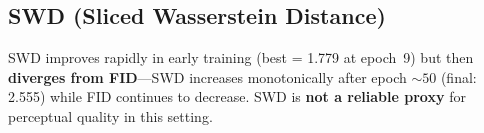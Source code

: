 \subsection{SWD (Sliced Wasserstein Distance)}

SWD improves rapidly in early training (best = 1.779 at epoch~9) but then
\textbf{diverges from FID}---SWD increases monotonically after epoch ${\sim}50$
(final: 2.555) while FID continues to decrease.  SWD is \textbf{not a reliable
proxy} for perceptual quality in this setting.
